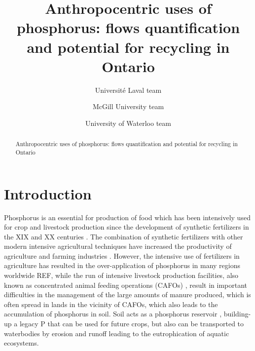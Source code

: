 \documentclass[authoryear]{elsarticle}
\begin{document}
\begin{frontmatter}
	\title{Anthropocentric uses of phosphorus: flows quantification and potential for recycling in Ontario}
	
	\author[ULaval]{Université Laval team}
	\author[McGill]{McGill University team}
	\author[Waterloo]{University of Waterloo team}
		
	\address[ULaval]{Université Laval}
	\address[McGill]{McGill University}
	\address[Waterloo]{University of Waterloo}
	
	\begin{abstract}
		Anthropocentric uses of phosphorus: flows quantification and potential for recycling in Ontario
	\end{abstract}
%	
\end{frontmatter}


\section{Introduction}
Phosphorus is an essential for production of food which has been intensively used for crop and livestock production since the development of synthetic fertilizers in the XIX and XX centuries \citep{Kausar19}. The combination of synthetic fertilizers with other modern intensive agricultural techniques have increased the productivity of agriculture and farming industries \citep{pingali2012green}.
However, the intensive use of fertilizers in agriculture has resulted in the over-application of phosphorus in many regions worldwide REF, while the run of intensive livestock production facilities, also known as concentrated animal feeding operations (CAFOs) \citep{animal_unit_definition}, result in important difficulties in the management of the large amounts of manure produced, which is often spread in lands in the vicinity of CAFOs, which also leads to the accumulation of phosphorus in soil. Soil acts as a phosphorus reservoir \citep{ehlert2003potential}, building-up a legacy P that can be used for future crops, but also can be transported to waterbodies by erosion and runoff leading to the eutrophication of aquatic ecosystems.
\end{document}
